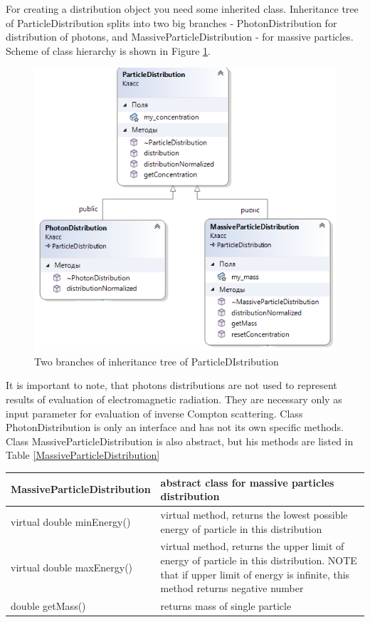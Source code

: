 For creating a distribution object you need some inherited class. Inheritance tree of ParticleDistribution splits into two big branches - PhotonDistribution for distribution of photons, and MassiveParticleDistribution - for massive particles. Scheme of class hierarchy is shown in Figure  \ref{particleDistribution0}. 

\begin{figure}
	\centering
	\includegraphics[width=8.5 cm]{./fig/particleDistribution0.png} 
	\caption{Two branches of inheritance tree of ParticleDIstribution}
	\label{particleDistribution0}
\end{figure}

It is important to note, that photons distributions are not used to represent results of evaluation of electromagnetic radiation. They are necessary only as input parameter for evaluation of inverse Compton scattering. Class PhotonDistribution is only an interface and has not its own specific methods. Class MassiveParticleDistribution is also abstract, but his methods are listed in Table \ref{MassiveParticleDistribution}	
\begin{small}
		\label{MassiveParticleDistribution}
		
			\begin{xtabular}{|p{0.45\textwidth}|p{0.55\textwidth}|}
				\hline
				\textbf{MassiveParticleDistribution} & abstract class for massive particles distribution\\
				\hline
				virtual double minEnergy() & virtual method, returns the lowest possible energy of particle in this distribution\\
				\hline
				virtual double maxEnergy() & 
				virtual method, returns the upper limit of energy of particle in this distribution. NOTE that if upper limit of energy is infinite, this method returns negative number\\
				\hline
				double getMass() & returns mass of single particle \\
				\hline
			\end{xtabular}
		\end{small}
